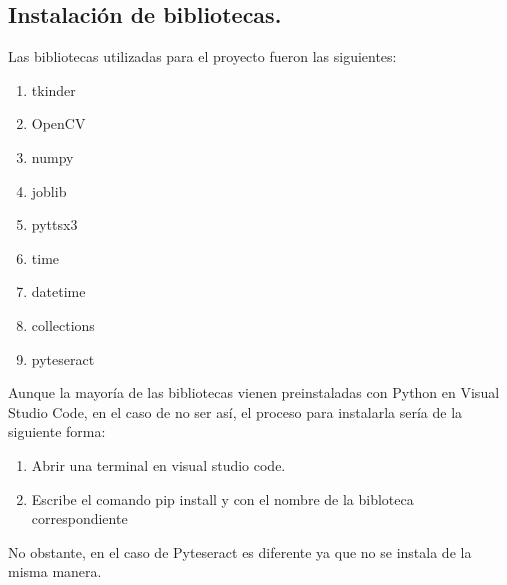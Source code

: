 \documentclass[12pt, letterpaper]{article}
\begin{document}
\subsection{Instalación de bibliotecas.}
Las bibliotecas utilizadas para el proyecto fueron las siguientes:\par 
\begin{enumerate}
    \item tkinder
    \item OpenCV
    \item numpy 
    \item joblib
    \item pyttsx3
    \item time 
    \item datetime
    \item collections 
    \item pyteseract 
\end{enumerate}
Aunque la mayoría de las bibliotecas vienen preinstaladas con Python en Visual Studio Code, en el caso de no ser así, el proceso para instalarla sería de la siguiente forma:\par
\begin{enumerate}
    \item Abrir una terminal en visual studio code.
    \item Escribe el comando pip install y con el nombre de la bibloteca correspondiente 
\end{enumerate}
No obstante, en el caso de Pyteseract es diferente ya que no se instala de la misma manera.\par 
\end{document}
